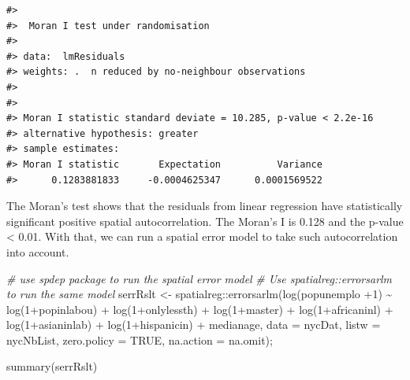 \documentclass[
  11pt,
]{book}
\newenvironment{Shaded}{\begin{snugshade}}{\end{snugshade}}
\newcommand{\AttributeTok}[1]{\textcolor[rgb]{0.77,0.63,0.00}{#1}}
\newcommand{\CommentTok}[1]{\textcolor[rgb]{0.56,0.35,0.01}{\textit{#1}}}
\newcommand{\ConstantTok}[1]{\textcolor[rgb]{0.00,0.00,0.00}{#1}}
\newcommand{\DecValTok}[1]{\textcolor[rgb]{0.00,0.00,0.81}{#1}}
\newcommand{\FunctionTok}[1]{\textcolor[rgb]{0.00,0.00,0.00}{#1}}
\newcommand{\NormalTok}[1]{#1}
\newcommand{\OtherTok}[1]{\textcolor[rgb]{0.56,0.35,0.01}{#1}}
\newcommand{\SpecialCharTok}[1]{\textcolor[rgb]{0.00,0.00,0.00}{#1}}
\begin{document}
\begin{verbatim}
#> 
#>  Moran I test under randomisation
#> 
#> data:  lmResiduals  
#> weights: .  n reduced by no-neighbour observations
#>   
#> 
#> Moran I statistic standard deviate = 10.285, p-value < 2.2e-16
#> alternative hypothesis: greater
#> sample estimates:
#> Moran I statistic       Expectation          Variance 
#>      0.1283881833     -0.0004625347      0.0001569522
\end{verbatim}

The Moran's test shows that the residuals from linear regression have statistically significant positive spatial autocorrelation. The Moran's I is 0.128 and the p-value \textless{} 0.01. With that, we can run a spatial error model to take such autocorrelation into account.

\begin{Shaded}
\begin{Highlighting}[]
\CommentTok{\# use spdep package to run the spatial error model }
\CommentTok{\# Use spatialreg::errorsarlm to run the same model}
\NormalTok{serrRslt }\OtherTok{\textless{}{-}}\NormalTok{ spatialreg}\SpecialCharTok{::}\FunctionTok{errorsarlm}\NormalTok{(}\FunctionTok{log}\NormalTok{(popunemplo }\SpecialCharTok{+}\DecValTok{1}\NormalTok{) }\SpecialCharTok{\textasciitilde{}} \FunctionTok{log}\NormalTok{(}\DecValTok{1}\SpecialCharTok{+}\NormalTok{popinlabou) }\SpecialCharTok{+}
                \FunctionTok{log}\NormalTok{(}\DecValTok{1}\SpecialCharTok{+}\NormalTok{onlylessth) }\SpecialCharTok{+} \FunctionTok{log}\NormalTok{(}\DecValTok{1}\SpecialCharTok{+}\NormalTok{master) }\SpecialCharTok{+} 
                \FunctionTok{log}\NormalTok{(}\DecValTok{1}\SpecialCharTok{+}\NormalTok{africaninl) }\SpecialCharTok{+} \FunctionTok{log}\NormalTok{(}\DecValTok{1}\SpecialCharTok{+}\NormalTok{asianinlab) }\SpecialCharTok{+} 
                \FunctionTok{log}\NormalTok{(}\DecValTok{1}\SpecialCharTok{+}\NormalTok{hispanicin) }\SpecialCharTok{+}\NormalTok{ medianage,}
              \AttributeTok{data =}\NormalTok{ nycDat,}
              \AttributeTok{listw =}\NormalTok{ nycNbList,}
              \AttributeTok{zero.policy =} \ConstantTok{TRUE}\NormalTok{, }
              \AttributeTok{na.action =}\NormalTok{ na.omit);}

\FunctionTok{summary}\NormalTok{(serrRslt)}
\end{Highlighting}
\end{Shaded}
\end{document}
